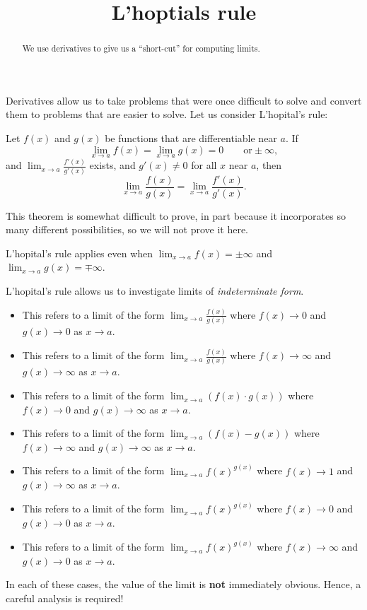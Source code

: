 \documentclass{ximera}
\title[Dig-In:]{L'hoptials rule}
\begin{document}
\begin{abstract}
  We use derivatives to give us a ``short-cut'' for computing limits.
\end{abstract}
\maketitle

Derivatives allow us to take problems that were once difficult to
solve and convert them to problems that are easier to solve. Let us
consider L'hopital's rule:

\begin{theorem} 
Let $f(x)$ and $g(x)$ be functions that are differentiable near $a$.  If
\[
\lim_{x \to a} f(x) = \lim_{x \to a}g(x) = 0 \qquad \text{or} \pm \infty,
\]
and $\lim_{x \to a} \frac{f'(x)}{g'(x)}$ exists, and $g'(x) \neq 0$
for all $x$ near $a$, then 
\[
\lim_{x \to a} \frac{f(x)}{g(x)} = \lim_{x \to a} \frac{f'(x)}{g'(x)}.
\]
\end{theorem}

This theorem is somewhat difficult to prove, in part because it
incorporates so many different possibilities, so we will not prove it
here. 
\begin{remark}
  L'hopital's rule applies even when $\lim_{x\to a}f(x) = \pm \infty$
  and $\lim_{x\to a}g(x) = \mp \infty$.
\end{remark}


L'hopital's rule allows us to investigate limits of
\textit{indeterminate form}.

\begin{definition}\hfil
\begin{itemize}
\item\zeroOverZero This refers to a limit of the form $\lim_{x\to a}
  \frac{f(x)}{g(x)}$ where $f(x)\to 0$ and $g(x)\to 0$ as $x\to a$.
\item\inftyOverInfty This refers to a limit of the form $\lim_{x\to a}
  \frac{f(x)}{g(x)}$ where $f(x)\to \infty$ and $g(x)\to \infty$ as $x\to a$.
\item\zeroOverInfty This refers to a limit of the form $\lim_{x\to a}
  \left(f(x)\cdot g(x)\right)$ where $f(x)\to 0$ and $g(x)\to \infty$ as $x\to a$.
\item\inftyMinusInfty This refers to a limit of the form $\lim_{x\to a}\left(
  f(x)-g(x)\right)$ where $f(x)\to \infty$ and $g(x)\to \infty$ as $x\to a$.
\item\oneToInfty This refers to a limit of the form $\lim_{x\to a}
  f(x)^{g(x)}$ where $f(x)\to 1$ and $g(x)\to \infty$ as $x\to a$.
\item\zeroToZero This refers to a limit of the form $\lim_{x\to a}
  f(x)^{g(x)}$ where $f(x)\to 0$ and $g(x)\to 0$ as $x\to a$.
\item\inftyToZero This refers to a limit of the form $\lim_{x\to a}
  f(x)^{g(x)}$ where $f(x)\to \infty$ and $g(x)\to 0$ as $x\to a$.
\end{itemize}
In each of these cases, the value of the limit is \textbf{not} immediately
obvious. Hence, a careful analysis is required!
\end{definition}
\end{document}

